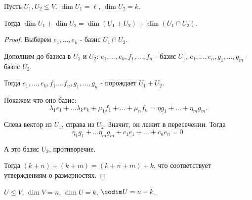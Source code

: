 \begin{statement} \thmslashn

    Пусть $U_1, U_2 \le V$. $\dim U_1 = \ell$, $\dim U_2 = k$.

    Тогда $\dim U_1 + \dim U_2 = \dim (U_1 + U_2) + \dim (U_1\cap U_2)$.
    \begin{proof}
       Выберем $e_1, \ldots, e_{k}$ - базис $U_1\cap U_2$.

       Дополним до базиса в $U_1$ и $U_2$: $e_1, \ldots, e_{k}, f_1, \ldots, f_{n}$ - базис $U_1$, $e_1, \ldots, e_{n}, g_1, \ldots, g_{m}$ - базис $U_2$.

       Тогда $e_1, \ldots, e_{k}, f_1. \ldots f_{n}, g_1, \ldots, g_{n}$ - порождает $U_1 + U_2$.

       Покажем что оно базис:
       \[ \lambda_1e_1 + \ldots \lambda_{k}e_{k} + \mu_1 f_1 + \ldots + \mu_{n}f_{n} = \eta g_1 + \ldots + \eta_{m}g_{m} .\]

       Слева вектор из $U_1$, справа из $U_2$. Значит, он лежит в пересечении. Тогда
       \[ \eta_1g_1 + \ldots \eta_{m}g_{m} + c_1e_1 + \ldots + c_{n}e_{n} = 0 .\]

       А это базис $U_2$, противоречие.

       Тогда $(k + n) + (k + m) = (k + n + m) + k$, что соответствует утверждениям о размерностях.
    \end{proof}
\end{statement}
\begin{definition} \thmslashn 

    $U \le V$, $\dim V = n$,  $\dim U = k$,   $\codim U = n - k$.
\end{definition}

